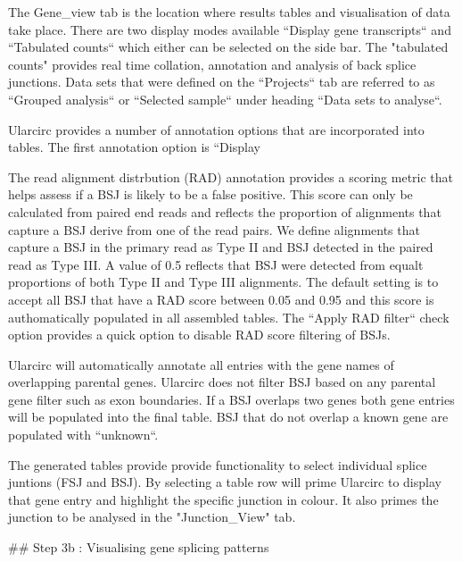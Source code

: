 The Gene_view tab is the location where results tables and visualisation of data take place. There are two display modes available ``Display gene transcripts`` and ``Tabulated counts`` which either can be selected on the side bar. The "tabulated counts" provides real time collation, annotation and analysis of back splice junctions. Data sets that were defined on the ``Projects`` tab are referred to as ``Grouped analysis`` or ``Selected sample`` under heading ``Data sets to analyse``.

Ularcirc provides a number of annotation options that are incorporated into tables. The first annotation option is ``Display %

The read alignment distrbution (RAD) annotation provides a scoring metric that helps assess if a BSJ is likely to be a false positive. This score can only be calculated from paired end reads and reflects the proportion of alignments that capture a BSJ derive from one of the read pairs. We define alignments that capture a BSJ in the primary read as Type II and BSJ detected in the paired read as Type III. A value of 0.5 reflects that BSJ were detected from equalt proportions of both Type II and Type III alignments. The default setting is to accept all BSJ that have a RAD score between 0.05 and 0.95 and this score is authomatically populated in all assembled tables. The ``Apply RAD filter`` check option provides a quick option to disable RAD score filtering of BSJs.  

Ularcirc will automatically annotate all entries with the gene names of overlapping parental genes. Ularcirc does not filter BSJ based on any parental gene filter such as exon boundaries. If a BSJ overlaps two genes both gene entries will be populated into the final table. BSJ that do not overlap a known gene are populated with ``unknown``. 

The generated tables provide provide functionality to select individual splice juntions (FSJ and BSJ). By selecting a table row will prime Ularcirc to display that gene entry and highlight the specific junction in colour. It also primes the junction to be analysed in the "Junction_View" tab.


## Step 3b : Visualising gene splicing patterns

